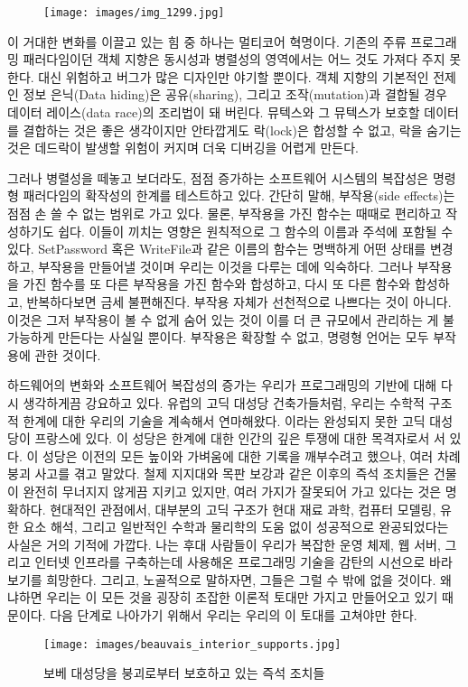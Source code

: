 \begin{figure}[H]
\centering
\texttt{[image: images/img\_1299.jpg]}
\end{figure}

\noindent
이 거대한 변화를 이끌고 있는 힘 중 하나는 멀티코어 혁명이다.
기존의 주류 프로그래밍 패러다임이던 객체 지향은 동시성과 병렬성의 영역에서는 어느 것도 가져다 주지 못 한다.
대신 위험하고 버그가 많은 디자인만 야기할 뿐이다.
객체 지향의 기본적인 전제인 정보 은닉(Data hiding)은 공유(sharing), 그리고 조작(mutation)과 결합될 경우 데이터 레이스(data race)의 조리법이 돼 버린다.
뮤텍스와 그 뮤텍스가 보호할 데이터를 결합하는 것은 좋은 생각이지만 안타깝게도 락(lock)은 합성할 수 없고, 락을 숨기는 것은 데드락이 발생할 위험이 커지며 더욱 디버깅을 어렵게 만든다.

그러나 병렬성을 떼놓고 보더라도, 점점 증가하는 소프트웨어 시스템의 복잡성은 명령형 패러다임의 확작성의 한계를 테스트하고 있다.
간단히 말해, 부작용(side effects)는 점점 손 쓸 수 없는 범위로 가고 있다. 물론, 부작용을 가진 함수는 때때로 편리하고 작성하기도 쉽다.
이들이 끼치는 영향은 원칙적으로 그 함수의 이름과 주석에 포함될 수 있다.
SetPassword 혹은 WriteFile과 같은 이름의 함수는 명백하게 어떤 상태를 변경하고, 부작용을 만들어낼 것이며 우리는 이것을 다루는 데에 익숙하다.
그러나 부작용을 가진 함수를 또 다른 부작용을 가진 함수와 합성하고, 다시 또 다른 함수와 합성하고, 반복하다보면 금세 불편해진다. 
부작용 자체가 선천적으로 나쁘다는 것이 아니다. 이것은 그저 부작용이 볼 수 없게 숨어 있는 것이 이를 더 큰 규모에서 관리하는 게 불가능하게 만든다는 사실일 뿐이다.
부작용은 확장할 수 없고, 명령형 언어는 모두 부작용에 관한 것이다.

하드웨어의 변화와 소프트웨어 복잡성의 증가는 우리가 프로그래밍의 기반에 대해 다시 생각하게끔 강요하고 있다.
유럽의 고딕 대성당 건축가들처럼, 우리는 수학적 구조적 한계에 대한 우리의 기술을 계속해서 연마해왔다. 
이라는 완성되지 못한 고딕 대성당이 프랑스에 있다.
이 성당은 한계에 대한 인간의 깊은 투쟁에 대한 목격자로서 서 있다.
이 성당은 이전의 모든 높이와 가벼움에 대한 기록을 깨부수려고 했으나, 여러 차례 붕괴 사고를 겪고 말았다.
철제 지지대와 목판 보강과 같은 이후의 즉석 조치들은 건물이 완전히 무너지지 않게끔 지키고 있지만, 여러 가지가 잘못되어 가고 있다는 것은 명확하다.
현대적인 관점에서, 대부분의 고딕 구조가 현대 재료 과학, 컴퓨터 모델링, 유한 요소 해석, 그리고 일반적인 수학과 물리학의 도움 없이 성공적으로 완공되었다는 사실은 거의 기적에 가깝다.
나는 후대 사람들이 우리가 복잡한 운영 체제, 웹 서버, 그리고 인터넷 인프라를 구축하는데 사용해온 프로그래밍 기술을 감탄의 시선으로 바라보기를 희망한다.
그리고, 노골적으로 말하자면, 그들은 그럴 수 밖에 없을 것이다. 왜냐하면 우리는 이 모든 것을 굉장히 조잡한 이론적 토대만 가지고 만들어오고 있기 때문이다.
다음 단계로 나아가기 위해서 우리는 우리의 이 토대를 고쳐야만 한다.

\begin{figure}
\centering
\texttt{[image: images/beauvais\_interior\_supports.jpg]}
\caption{보베 대성당을 붕괴로부터 보호하고 있는 즉석 조치들}
\end{figure}

